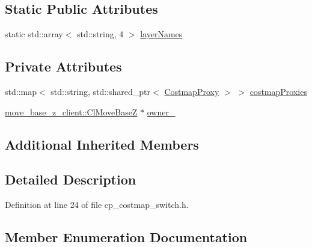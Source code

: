 \subsection*{Static Public Attributes}
\begin{DoxyCompactItemize}
\item 
static std\+::array$<$ std\+::string, 4 $>$ \hyperlink{classmove__base__z__client_1_1CostmapSwitch_adf295965004c939144db60ef353ad89e}{layer\+Names}
\end{DoxyCompactItemize}
\subsection*{Private Attributes}
\begin{DoxyCompactItemize}
\item 
std\+::map$<$ std\+::string, std\+::shared\+\_\+ptr$<$ \hyperlink{classmove__base__z__client_1_1CostmapProxy}{Costmap\+Proxy} $>$ $>$ \hyperlink{classmove__base__z__client_1_1CostmapSwitch_ab9b33bc5774b41e5898718ffdcfcbc25}{costmap\+Proxies}
\item 
\hyperlink{classmove__base__z__client_1_1ClMoveBaseZ}{move\+\_\+base\+\_\+z\+\_\+client\+::\+Cl\+Move\+BaseZ} $\ast$ \hyperlink{classmove__base__z__client_1_1CostmapSwitch_a00517c28045327007d7b9335c9b433ed}{owner\+\_\+}
\end{DoxyCompactItemize}
\subsection*{Additional Inherited Members}


\subsection{Detailed Description}


Definition at line 24 of file cp\+\_\+costmap\+\_\+switch.\+h.



\subsection{Member Enumeration Documentation}
\mbox{\label{classmove__base__z__client_1_1CostmapSwitch_a810338d2ba3fe25fc4ecf8c6c85b462b}} 
